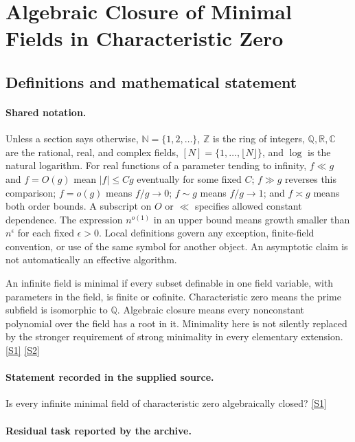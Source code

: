 \documentclass[11pt,a4paper]{article}
\newcommand{\N}{\mathbb{N}}
\newcommand{\Z}{\mathbb{Z}}
\newcommand{\Q}{\mathbb{Q}}
\newcommand{\R}{\mathbb{R}}
\newcommand{\C}{\mathbb{C}}
\newcommand{\sref}[2]{\hyperlink{source:#1:#2}{[S#2]}}
\begin{document}
\section{Algebraic Closure of Minimal Fields in Characteristic Zero}\label{statement}


\subsection{Definitions and mathematical statement}

\paragraph{Shared notation.}Unless a section says otherwise, $\N=\{1,2,\ldots\}$,
$\Z$ is the ring of integers, $\Q,\R,\C$ are the rational, real, and complex
fields, $[N]=\{1,\ldots,\lfloor N\rfloor\}$, and $\log$ is the natural
logarithm. For real functions of a parameter tending to infinity,
$f\ll g$ and $f=O(g)$ mean $|f|\leq Cg$ eventually for some fixed $C$;
$f\gg g$ reverses this comparison; $f=o(g)$ means $f/g\to0$;
$f\sim g$ means $f/g\to1$; and $f\asymp g$ means both order bounds.
A subscript on $O$ or $\ll$ specifies allowed constant dependence.
The expression $n^{o(1)}$ in an upper bound means growth smaller than
$n^\epsilon$ for each fixed $\epsilon>0$. Local definitions govern any
exception, finite-field convention, or use of the same symbol for another
object. An asymptotic claim is not automatically an effective algorithm.



An infinite field is minimal if every subset definable in one field variable, with parameters in the field, is finite or cofinite. Characteristic zero means the prime subfield is isomorphic to $\Q$. Algebraic closure means every nonconstant polynomial over the field has a root in it. Minimality here is not silently replaced by the stronger requirement of strong minimality in every elementary extension. \sref{statement}{1} \sref{statement}{2}

\paragraph{Statement recorded in the supplied source.}
Is every infinite minimal field of characteristic zero algebraically closed? \sref{statement}{1}

\paragraph{Residual task reported by the archive.}
\end{document}

